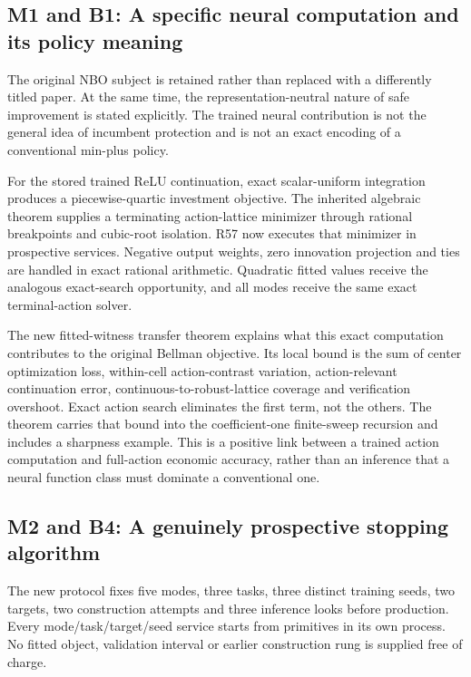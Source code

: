 \hypertarget{m1-and-b1-a-specific-neural-computation-and-its-policy-meaning}{%
\subsection{M1 and B1: A specific neural computation and its policy
meaning}\label{m1-and-b1-a-specific-neural-computation-and-its-policy-meaning}}

The original NBO subject is retained rather than replaced with a
differently titled paper. At the same time, the representation-neutral
nature of safe improvement is stated explicitly. The trained neural
contribution is not the general idea of incumbent protection and is not
an exact encoding of a conventional min-plus policy.

For the stored trained ReLU continuation, exact scalar-uniform
integration produces a piecewise-quartic investment objective. The
inherited algebraic theorem supplies a terminating action-lattice
minimizer through rational breakpoints and cubic-root isolation. R57 now
executes that minimizer in prospective services. Negative output
weights, zero innovation projection and ties are handled in exact
rational arithmetic. Quadratic fitted values receive the analogous
exact-search opportunity, and all modes receive the same exact
terminal-action solver.

The new fitted-witness transfer theorem explains what this exact
computation contributes to the original Bellman objective. Its local
bound is the sum of center optimization loss, within-cell
action-contrast variation, action-relevant continuation error,
continuous-to-robust-lattice coverage and verification overshoot. Exact
action search eliminates the first term, not the others. The theorem
carries that bound into the coefficient-one finite-sweep recursion and
includes a sharpness example. This is a positive link between a trained
action computation and full-action economic accuracy, rather than an
inference that a neural function class must dominate a conventional one.

\hypertarget{m2-and-b4-a-genuinely-prospective-stopping-algorithm}{%
\subsection{M2 and B4: A genuinely prospective stopping
algorithm}\label{m2-and-b4-a-genuinely-prospective-stopping-algorithm}}

The new protocol fixes five modes, three tasks, three distinct training
seeds, two targets, two construction attempts and three inference looks
before production. Every mode/task/target/seed service starts from
primitives in its own process. No fitted object, validation interval or
earlier construction rung is supplied free of charge.

